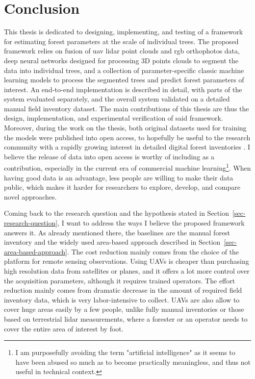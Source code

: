 \chapter{Conclusion}\label{cap:conclusion}


This thesis is dedicated to designing, implementing, and testing of a framework for estimating forest parameters at the scale of individual trees.
The proposed framework relies on fusion of \gls{uav} \gls{lidar} point clouds and \gls{rgb} orthophotos data, deep neural networks designed for processing 3D points clouds to segment the data into individual trees, and a collection of parameter-specific classic machine learning models to process the segmented trees and predict forest parameters of interest.
An end-to-end implementation is described in detail, with parts of the system evaluated separately, and the overall system validated on a detailed manual field inventory dataset.
The main contributions of this thesis are thus the design, implementation, and experimental verification of said framework.
Moreover, during the work on the thesis, both original datasets used for training the models were published into open access, to hopefully be useful to the research community with a rapidly growing interest in detailed digital forest inventories \citep{dubrovinExplorationPropertiesPoint2024, dubrovinOpenDatasetIndividual2024}.
I believe the release of data into open access is worthy of including as a contribution, especially in the current era of commercial machine learning\footnote{I am purposefully avoiding the term "artificial intelligence" as it seems to have been abused so much as to become practically meaningless, and thus not useful in technical context.}.
When having good data is an advantage, less people are willing to make their data public, which makes it harder for researchers to explore, develop, and compare novel approaches.

Coming back to the research question and the hypothesis stated in Section~\ref{sec-research-question}, I want to address the ways I believe the proposed framework answers it.
As already mentioned there, the baselines are the manual forest inventory and the widely used area-based approach described in Section~\ref{sec-area-based-approach}.
The cost reduction mainly comes from the choice of the platform for remote sensing observations.
Using UAVs is cheaper than purchasing high resolution data from satellites or planes, and it offers a lot more control over the acquisition parameters, although it requires trained operators.
The effort reduction mainly comes from dramatic decrease in the amount of required field inventory data, which is very labor-intensive to collect.
UAVs are also allow to cover huge areas easily by a few people, unlike fully manual inventories or those based on terrestrial \gls{lidar} measurements, where a forester or an operator needs to cover the entire area of interest by foot.

